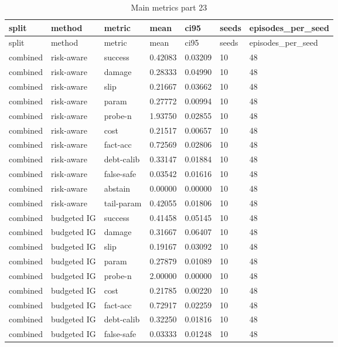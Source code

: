 \documentclass{article}
\begin{document}
\begin{center}
\tiny
\renewcommand{\arraystretch}{0.92}
\setlength{\tabcolsep}{3pt}
\begin{longtable}{lllllll}
\caption{Main metrics part 23}\label{tab:main-metrics-23}\\
\toprule
split & method & metric & mean & ci95 & seeds & episodes\_per\_seed \\
\midrule
\endfirsthead
\toprule
split & method & metric & mean & ci95 & seeds & episodes\_per\_seed \\
\midrule
\endhead
combined & risk-aware & success & 0.42083 & 0.03209 & 10 & 48 \\
combined & risk-aware & damage & 0.28333 & 0.04990 & 10 & 48 \\
combined & risk-aware & slip & 0.21667 & 0.03662 & 10 & 48 \\
combined & risk-aware & param & 0.27772 & 0.00994 & 10 & 48 \\
combined & risk-aware & probe-n & 1.93750 & 0.02855 & 10 & 48 \\
combined & risk-aware & cost & 0.21517 & 0.00657 & 10 & 48 \\
combined & risk-aware & fact-acc & 0.72569 & 0.02806 & 10 & 48 \\
combined & risk-aware & debt-calib & 0.33147 & 0.01884 & 10 & 48 \\
combined & risk-aware & false-safe & 0.03542 & 0.01616 & 10 & 48 \\
combined & risk-aware & abstain & 0.00000 & 0.00000 & 10 & 48 \\
combined & risk-aware & tail-param & 0.42055 & 0.01806 & 10 & 48 \\
combined & budgeted IG & success & 0.41458 & 0.05145 & 10 & 48 \\
combined & budgeted IG & damage & 0.31667 & 0.06407 & 10 & 48 \\
combined & budgeted IG & slip & 0.19167 & 0.03092 & 10 & 48 \\
combined & budgeted IG & param & 0.27879 & 0.01089 & 10 & 48 \\
combined & budgeted IG & probe-n & 2.00000 & 0.00000 & 10 & 48 \\
combined & budgeted IG & cost & 0.21785 & 0.00220 & 10 & 48 \\
combined & budgeted IG & fact-acc & 0.72917 & 0.02259 & 10 & 48 \\
combined & budgeted IG & debt-calib & 0.32250 & 0.01816 & 10 & 48 \\
combined & budgeted IG & false-safe & 0.03333 & 0.01248 & 10 & 48 \\

\end{longtable}
\end{center}
\end{document}
